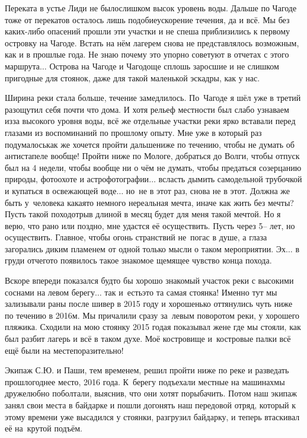 Переката в устье Лиди не было\mdash слишком высок уровень воды. Дальше по Чагоде тоже от перекатов осталось лишь подобие\mdash ускорение течения, да и всё. Мы без каких-либо опасений прошли эти участки и не спеша приблизились к первому островку на Чагоде. Встать на нём лагерем снова не представлялось возможным, как и в прошлые года. Не знаю почему это упорно советуют в отчетах с этого маршрута$\ldots$ Острова на Чагоде и Чагодоще сплошь заросшие и не слишком пригодные для стоянок, даже для такой маленькой эскадры, как у нас.

Ширина реки стала больше, течение замедлилось. По~Чагоде я шёл уже в третий раз\mdash ощутил себя почти что дома. И хотя рельеф местности был слабо узнаваем из\sdash за высокого уровня воды, всё же отдельные участки реки ярко вставали перед глазами из воспоминаний по прошлому опыту. Мне уже в который раз подумалось\mdash как же хочется пройти дальше\mdash ниже по течению, чтобы не думать об антистапеле вообще! Пройти ниже по Мологе, добраться до Волги, чтобы отпуск был на 4 недели, чтобы вообще ни о чём не думать, чтобы предаться созерцанию природы, фотоохоте и астрофотографии$\ldots$ всласть дымить самодельной трубочкой и купаться в освежающей воде$\ldots$ но~не в этот раз, снова не в этот. Должна же быть у~человека какая\sdash то немного нереальная мечта, иначе как жить без мечты? Пусть такой поход\sdash отрыв длиной в месяц будет для меня такой мечтой. Но я верю, что рано или поздно, мне удастся её осуществить. Пусть через 5\thinspace\nobreakdash-- лет, но осуществить. Главное, чтобы огонь странствий не~погас в душе, а глаза загорались диким пламенем от одной только мысли о таком мероприятии. Эх$\ldots$ в груди отчего\sdash то появилось такое знакомое щемящее чувство конца похода. 

Вскоре впереди показался будто бы хорошо знакомый участок реки с высокими соснами на левом берегу$\ldots$ так и~есть\mdash это та самая стоянка! Именно тут мы зализывали раны после шивер в 2015 году и хорошенько оттянулись чуть ниже по течению в 2016\sdash м. Мы причалили сразу за~левым поворотом реки, у хорошего пляжика. Сходили на мою стоянку 2015 года\mdash я показывал жене где мы стояли, как был разбит лагерь и всё в таком духе. Моё костровище и~костровые палки всё ещё были на месте\mdash поразительно! 

Экипаж С.Ю. и Паши, тем временем, решил пройти ниже по реке и разведать прошлогоднее место, 2016 года. К~берегу подъехали местные на машинах\mdash мы дружелюбно поболтали, выяснив, что они хотят порыбачить. Потом наш экипаж занял свои места в байдарке и пошли догонять наш передовой отряд, который к этому времени уже высадился у стоянки, разгрузил байдарку, и теперь втаскивал её на~крутой подъём. 

